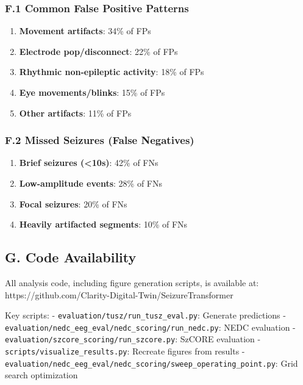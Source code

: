 \documentclass[
  10pt,
]{article}
\providecommand{\tightlist}{%
  \setlength{\itemsep}{0pt}\setlength{\parskip}{0pt}}
\begin{document}
\hypertarget{f.1-common-false-positive-patterns}{%
\subsubsection{F.1 Common False Positive
Patterns}\label{f.1-common-false-positive-patterns}}

\begin{enumerate}
\def\labelenumi{\arabic{enumi}.}
\tightlist
\item
  \textbf{Movement artifacts}: 34\% of FPs
\item
  \textbf{Electrode pop/disconnect}: 22\% of FPs
\item
  \textbf{Rhythmic non-epileptic activity}: 18\% of FPs
\item
  \textbf{Eye movements/blinks}: 15\% of FPs
\item
  \textbf{Other artifacts}: 11\% of FPs
\end{enumerate}

\hypertarget{f.2-missed-seizures-false-negatives}{%
\subsubsection{F.2 Missed Seizures (False
Negatives)}\label{f.2-missed-seizures-false-negatives}}

\begin{enumerate}
\def\labelenumi{\arabic{enumi}.}
\tightlist
\item
  \textbf{Brief seizures (\textless10s)}: 42\% of FNs
\item
  \textbf{Low-amplitude events}: 28\% of FNs
\item
  \textbf{Focal seizures}: 20\% of FNs
\item
  \textbf{Heavily artifacted segments}: 10\% of FNs
\end{enumerate}

\hypertarget{g.-code-availability}{%
\subsection{G. Code Availability}\label{g.-code-availability}}

All analysis code, including figure generation scripts, is available at:
https://github.com/Clarity-Digital-Twin/SeizureTransformer

Key scripts: - \texttt{evaluation/tusz/run\_tusz\_eval.py}: Generate
predictions -
\texttt{evaluation/nedc\_eeg\_eval/nedc\_scoring/run\_nedc.py}: NEDC
evaluation - \texttt{evaluation/szcore\_scoring/run\_szcore.py}: SzCORE
evaluation - \texttt{scripts/visualize\_results.py}: Recreate figures
from results -
\texttt{evaluation/nedc\_eeg\_eval/nedc\_scoring/sweep\_operating\_point.py}:
Grid search optimization
\end{document}
